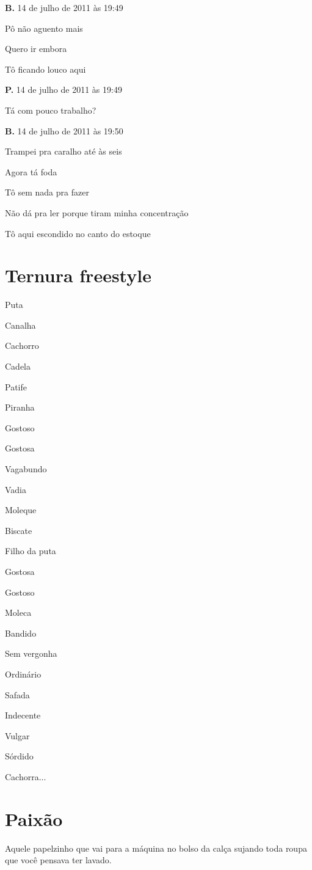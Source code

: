 \textbf{B.} 14 de julho de 2011 às 19:49

Pô não aguento mais

Quero ir embora

Tô ficando louco aqui

\textbf{P.} 14 de julho de 2011 às 19:49

Tá com pouco trabalho?

\textbf{B.} 14 de julho de 2011 às 19:50

Trampei pra caralho até às seis

Agora tá foda

Tô sem nada pra fazer

Não dá pra ler porque tiram minha concentração

Tô aqui escondido no canto do estoque

\chapter{Ternura freestyle}

Puta

Canalha

Cachorro

Cadela

Patife

Piranha

Gostoso

Gostosa

Vagabundo

Vadia

Moleque

Biscate

Filho da puta

Gostosa

Gostoso

Moleca

Bandido

Sem vergonha

Ordinário

Safada

Indecente

Vulgar

Sórdido

Cachorra...

\chapter{Paixão}

Aquele papelzinho que vai para a máquina no bolso da calça sujando toda
roupa que você pensava ter lavado.

